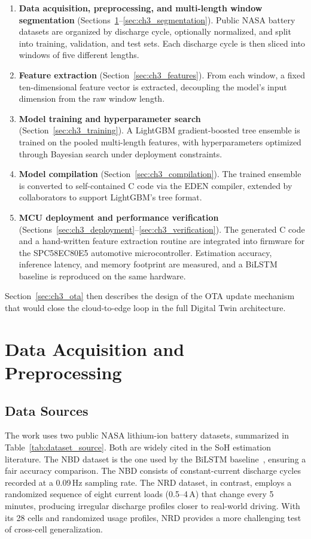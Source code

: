 \begin{enumerate}
    \item \textbf{Data acquisition, preprocessing, and multi-length window segmentation} (Sections~\ref{sec:ch3_data}--\ref{sec:ch3_segmentation}). Public NASA battery datasets are organized by discharge cycle, optionally normalized, and split into training, validation, and test sets. Each discharge cycle is then sliced into windows of five different lengths.
    \item \textbf{Feature extraction} (Section~\ref{sec:ch3_features}). From each window, a fixed ten-dimensional feature vector is extracted, decoupling the model's input dimension from the raw window length.
    \item \textbf{Model training and hyperparameter search} (Section~\ref{sec:ch3_training}). A LightGBM gradient-boosted tree ensemble is trained on the pooled multi-length features, with hyperparameters optimized through Bayesian search under deployment constraints.
    \item \textbf{Model compilation} (Section~\ref{sec:ch3_compilation}). The trained ensemble is converted to self-contained C code via the EDEN compiler, extended by collaborators to support LightGBM's tree format.
    \item \textbf{MCU deployment and performance verification} (Sections~\ref{sec:ch3_deployment}--\ref{sec:ch3_verification}). The generated C code and a hand-written feature extraction routine are integrated into firmware for the SPC58EC80E5 automotive microcontroller. Estimation accuracy, inference latency, and memory footprint are measured, and a BiLSTM baseline is reproduced on the same hardware.
\end{enumerate}

Section~\ref{sec:ch3_ota} then describes the design of the OTA update mechanism that would close the cloud-to-edge loop in the full Digital Twin architecture.


\section{Data Acquisition and Preprocessing}
\label{sec:ch3_data}

\subsection{Data Sources}

The work uses two public NASA lithium-ion battery datasets, summarized in Table~\ref{tab:dataset_source}. Both are widely cited in the SoH estimation literature. The NBD dataset is the one used by the BiLSTM baseline~\autocite{Sammartino2021}, ensuring a fair accuracy comparison. The NBD consists of constant-current discharge cycles recorded at a 0.09\,Hz sampling rate. The NRD dataset, in contrast, employs a randomized sequence of eight current loads (0.5--4\,A) that change every 5 minutes, producing irregular discharge profiles closer to real-world driving. With its 28 cells and randomized usage profiles, NRD provides a more challenging test of cross-cell generalization.

